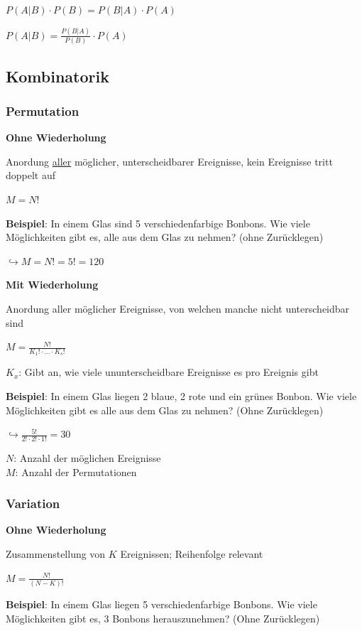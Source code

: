 $\displaystyle{
    P(A|B) \cdot P(B) = P(B|A) \cdot P(A)
}$

$\displaystyle{
    P(A|B) = \frac{P(B|A)}{P(B)} \cdot P(A)
}$

\subsection{Kombinatorik}

\subsubsection{Permutation}

\textbf{Ohne Wiederholung}

Anordung \underline{aller} möglicher, unterscheidbarer Ereignisse, kein Ereignisse tritt doppelt auf

$\displaystyle{
    M = N!
}$

\textbf{Beispiel}: In einem Glas sind 5 verschiedenfarbige Bonbons. Wie viele Möglichkeiten gibt es,
alle aus dem Glas zu nehmen? (ohne Zurücklegen)

$\hookrightarrow M = N! = 5! = 120$

\textbf{Mit Wiederholung}

Anordung aller möglicher Ereignisse, von welchen manche nicht unterscheidbar sind

$\displaystyle{
    M = \frac{N!}{K_1! \cdot ... \cdot K_s!}
}$

$K_x$: Gibt an, wie viele ununterscheidbare Ereignisse es pro Ereignis gibt

\textbf{Beispiel}: In einem Glas liegen 2 blaue, 2 rote und ein grünes Bonbon. Wie viele Möglichkeiten gibt es
alle aus dem Glas zu nehmen? (Ohne Zurücklegen)

$\displaystyle{
    \hookrightarrow \frac{5!}{2! \cdot 2! \cdot 1!} = 30
}$

$N$: Anzahl der möglichen Ereignisse\\
$M$: Anzahl der Permutationen

\subsubsection{Variation}

\textbf{Ohne Wiederholung}

Zusammenstellung von $K$ Ereignissen; Reihenfolge relevant

$\displaystyle{
    M = \frac{N!}{(N - K)!}
}$

\textbf{Beispiel}: In einem Glas liegen 5 verschiedenfarbige Bonbons. Wie viele Möglichkeiten gibt es, 3
Bonbons herauszunehmen? (Ohne Zurücklegen)

